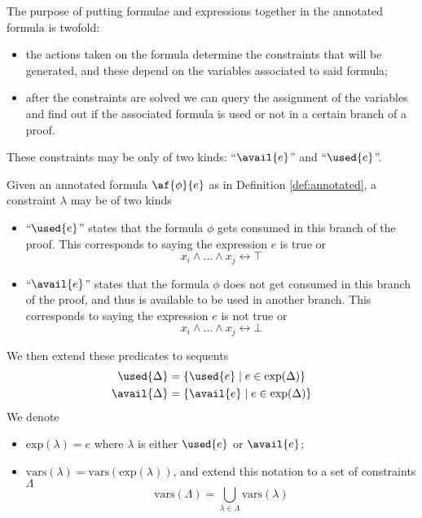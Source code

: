 \noindent The purpose of putting formulae and expressions together in the annotated formula is twofold:
\begin{itemize}
	\item the actions taken on the formula determine the constraints that will be generated, and these depend on the variables associated to said formula;
	\item after the constraints are solved we can query the assignment of the variables and find out if the associated formula is used or not in a certain branch of a proof.
\end{itemize}
These constraints may be only of two kinds: ``$\avail{e}$'' and ``$\used{e}$''.
\begin{define}[Constraints]
	\label{def:constraints}
	Given an annotated formula $\af{\phi}{e}$ as in Definition \ref{def:annotated}, a constraint $\lambda$ may be of two kinds
	\begin{itemize}
		\item ``$\used{e}$'' states that the formula $\phi$ gets consumed in this branch of the proof.
			This corresponds to saying the expression $e$ is true or
			$$ x_i \wedge \dots \wedge x_j \leftrightarrow \top $$
		\item ``$\avail{e}$'' states that the formula $\phi$ does not get consumed in this branch of the proof, and thus is available to be used in another branch.
			This corresponds to saying the expression $e$ is not true or
			$$ x_i \wedge \dots \wedge x_j \leftrightarrow \bot $$
	\end{itemize}
	We then extend these predicates to sequents
	\begin{align*}
		\used{\Delta} &= \{ \used{e} \mid e \in \mathrm{exp}(\Delta) \} \\
		\avail{\Delta} &= \{ \avail{e} \mid e \in \mathrm{exp}(\Delta) \}
	\end{align*}
	We denote
	\begin{itemize}
		\item $\mathrm{exp}(\lambda) = e$ where $\lambda$ is either $\used{e}$ or $\avail{e}$;
		\item $\mathrm{vars}(\lambda) = \mathrm{vars}(\mathrm{exp}(\lambda))$, and extend this notation to a set of constraints $\Lambda$
			$$ \mathrm{vars}(\Lambda) = \bigcup_{\lambda \in \Lambda} \mathrm{vars}(\lambda) $$
	\end{itemize}
\end{define}
